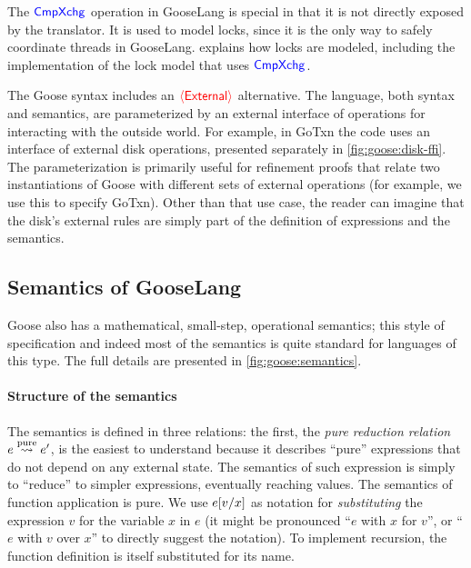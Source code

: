 The $\goosekw{CmpXchg}$ operation in GooseLang is special in that it is not
directly exposed by the translator. It is used to model locks, since it is the
only way to safely coordinate threads in GooseLang. 
explains how locks are modeled, including the implementation of the lock model
that uses $\goosekw{CmpXchg}$.

The Goose syntax includes an $\external$ alternative. The language, both syntax
and semantics, are parameterized by an external interface of operations for
interacting with the outside world. For example, in GoTxn the code uses an
interface of external disk operations, presented separately in
\cref{fig:goose:disk-ffi}. The parameterization is primarily useful for
refinement proofs that relate two instantiations of Goose with different sets of external operations (for example, we use this to specify GoTxn). Other than that use case,
the reader can imagine that the disk's external rules are simply part of the definition
of expressions and the semantics.

\subsection{Semantics of GooseLang}%
\label{sec:goose:semantics}

Goose also has a mathematical, small-step, operational semantics; this style of
specification and indeed most of the semantics is quite standard for languages of
this type. The full details are presented in \cref{fig:goose:semantics}.



\paragraph{Structure of the semantics}
The semantics is defined in three relations: the first, the
\emph{pure reduction relation} $e \purereduction e'$, is the easiest to understand
because it describes ``pure'' expressions that do not depend on any external
state. The semantics of such expression is simply to ``reduce'' to simpler
expressions, eventually reaching values. The semantics of function application
is pure. We use $\subst{e}{x}{v}$ as notation for \emph{substituting} the expression
$v$ for the variable $x$ in $e$ (it might be pronounced ``$e$ with $x$ for
$v$'', or ``$e$ with $v$ over $x$'' to directly suggest the notation).
To implement recursion, the function definition
is itself substituted for its name.

